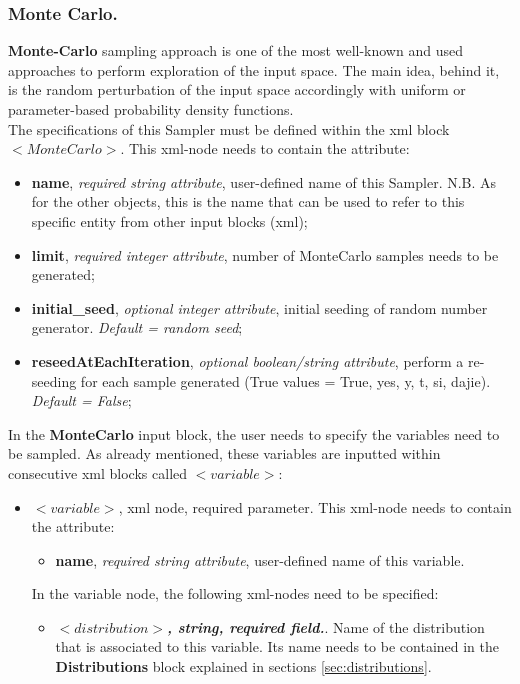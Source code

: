 \subsubsection{Monte Carlo.}
\label{subsubsubsec:MC}
\textbf{Monte-Carlo} sampling approach is one of the most well-known and used approaches to perform exploration of the input space. The main idea, behind it, is the random perturbation of the input space accordingly with uniform or parameter-based probability density functions. 
\\ The specifications of this Sampler must be defined within the xml block $<MonteCarlo>$. This xml-node needs to contain the attribute:
\vspace{-5mm}
\begin{itemize}
\itemsep0em
\item \textbf{name}, \textit{required string attribute}, user-defined name of this Sampler. N.B. As for the other objects, this is the name that can be used to refer to this specific entity from other input blocks (xml);
\item \textbf{limit}, \textit{required integer attribute}, number of MonteCarlo samples needs to be generated;
\item \textbf{initial\_seed}, \textit{optional integer attribute}, initial seeding of random number generator. \textit{Default = random seed};
\item \textbf{reseedAtEachIteration}, \textit{optional boolean/string attribute}, perform a re-seeding for each sample generated (True values = True, yes, y, t, si, dajie). \textit{Default = False}; 
\end{itemize}
\vspace{-5mm}
In the \textbf{MonteCarlo} input block, the user needs to specify the variables need to be sampled. As already mentioned, these variables are inputted within consecutive xml blocks called $<variable>$:
\begin{itemize}
\item $<variable>$, xml node, required parameter. This xml-node needs to contain the attribute:
\begin{itemize}
  \item \textbf{name}, \textit{required string attribute}, user-defined name of this variable. 
\end{itemize}
 In the variable node, the following xml-nodes need to be specified:
 \begin{itemize}
    \item $<distribution>$\textbf{\textit{, string, required field.}}. Name of the distribution that is associated to this variable. Its name needs to be contained in the \textbf{Distributions} block explained in sections \ref{sec:distributions}.
  \end{itemize}
\end{itemize}

